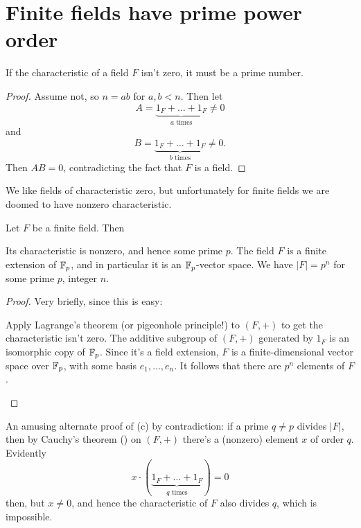 \section{Finite fields have prime power order}
\begin{lemma}
	If the characteristic of a field $F$ isn't zero,
	it must be a prime number.
\end{lemma}
\begin{proof}
	Assume not, so $n = ab$ for $a,b < n$.
	Then let
	\[ A = \underbrace{1_F + \dots + 1_F}_{\text{$a$ times}} \neq 0 \]
	and
	\[ B = \underbrace{1_F + \dots + 1_F}_{\text{$b$ times}} \neq 0. \]
	Then $AB = 0$, contradicting the fact that $F$ is a field.
\end{proof}

We like fields of characteristic zero, but unfortunately for finite fields
we are doomed to have nonzero characteristic.

\begin{lemma}
	Let $F$ be a finite field.
	Then
	\begin{enumerate}[(a)]
		\ii Its characteristic is nonzero, and hence some prime $p$.
		\ii The field $F$ is a finite extension of $\mathbb F_p$,
		and in particular it is an $\mathbb F_p$-vector space.
		\ii We have $\left\lvert F \right\rvert = p^n$ for some prime $p$, integer $n$.
	\end{enumerate}
\end{lemma}
\begin{proof}
	Very briefly, since this is easy:
	\begin{enumerate}[(a)]
		\ii Apply Lagrange's theorem (or pigeonhole principle!)
		to $(F, +)$ to get the characteristic isn't zero.
		\ii The additive subgroup of $(F,+)$ generated
		by $1_F$ is an isomorphic copy of $\mathbb F_p$.
		\ii Since it's a field extension,
		$F$ is a finite-dimensional vector space over $\mathbb F_p$,
		with some basis $e_1, \dots, e_n$.
		It follows that there are $p^n$ elements of $F$. \qedhere
	\end{enumerate}
\end{proof}
\begin{remark}
	An amusing alternate proof of (c) by contradiction:
	if a prime $q \neq p$ divides $\left\lvert F \right\rvert$, then
	by Cauchy's theorem () on $(F, +)$
	there's a (nonzero) element $x$ of order $q$.
	Evidently \[ x \cdot ( \underbrace{1_F + \dots + 1_F}_{\text{$q$ times}} ) = 0 \]
	then, but $x \neq 0$, and hence the characteristic of $F$ also divides $q$,
	which is impossible.
\end{remark}

